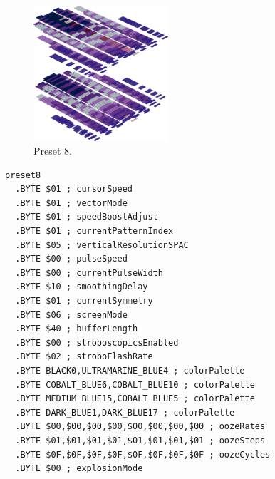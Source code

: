 \vspace*{-0.5cm}
\begin{minipage}[b]{0.48\linewidth}
\begin{figure}[H]                                                          
  \centering                                                             
  \begin{adjustbox}{width=5cm,center}                                   
  \includegraphics[width=5cm]{src/colorspace_presets/preset8-45.png}%
  \end{adjustbox}                                                        
\caption*{Preset 8.}                                           
\end{figure}                                                               
\end{minipage}
\hspace{0.1cm}
\begin{minipage}[b]{0.48\linewidth}                                                                         
\begin{lstlisting}[basicstyle=\ttfamily\tiny]
preset8
  .BYTE $01 ; cursorSpeed
  .BYTE $01 ; vectorMode
  .BYTE $01 ; speedBoostAdjust
  .BYTE $01 ; currentPatternIndex
  .BYTE $05 ; verticalResolutionSPAC
  .BYTE $00 ; pulseSpeed
  .BYTE $00 ; currentPulseWidth
  .BYTE $10 ; smoothingDelay
  .BYTE $01 ; currentSymmetry
  .BYTE $06 ; screenMode
  .BYTE $40 ; bufferLength
  .BYTE $00 ; stroboscopicsEnabled
  .BYTE $02 ; stroboFlashRate
  .BYTE BLACK0,ULTRAMARINE_BLUE4 ; colorPalette
  .BYTE COBALT_BLUE6,COBALT_BLUE10 ; colorPalette
  .BYTE MEDIUM_BLUE15,COBALT_BLUE5 ; colorPalette
  .BYTE DARK_BLUE1,DARK_BLUE17 ; colorPalette
  .BYTE $00,$00,$00,$00,$00,$00,$00,$00 ; oozeRates
  .BYTE $01,$01,$01,$01,$01,$01,$01,$01 ; oozeSteps
  .BYTE $0F,$0F,$0F,$0F,$0F,$0F,$0F,$0F ; oozeCycles
  .BYTE $00 ; explosionMode
\end{lstlisting}
\end{minipage}


